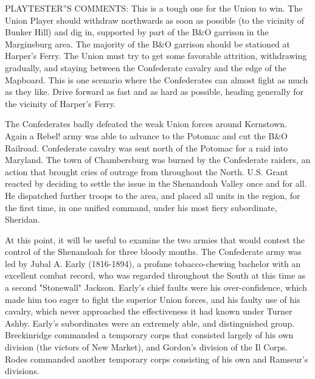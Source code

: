 PLAYTESTER''S COMMENTS: This is a tough one for the Union to win. The Union Player should withdraw northwards as soon as possible (to the vicinity of Bunker Hill) and dig in, supported by part of the B\&O garrison in the Marginsburg area. The majority of the B\&O garrison should be stationed at Harper's Ferry. The Union must try to get some favorable attrition, withdrawing gradually, and staying between the Confederate cavalry and the edge of the Mapboard. This is one scenario where the Confederates can almost fight as much as they like. Drive forward as fast and as hard as possible, heading generally for the vicinity of Harper's Ferry.

The Confederates badly defeated the weak Union forces around Kernstown. Again a Rebel! army was able to advance to the Potomac and cut the B\&O Railroad. Confederate cavalry was sent north of the Potomac for a raid into Maryland. The town of Chambersburg was burned by the Confederate raiders, an action that brought cries of outrage from throughout the North. U.S. Grant reacted by deciding to settle the issue in the Shenandoah Valley once and for all. He dispatched further troops to the area, and placed all units in the region, for the first time, in one unified command, under his most fiery subordinate, Sheridan.

At this point, it will be useful to examine the two armies that would contest the control of the Shenandoah for three bloody months. The Confederate army was led by Jubal A. Early (1816-1894), a profane tobacco-chewing bachelor with an excellent combat record, who was regarded throughout the South at this time as a second "Stonewall" Jackson. Early's chief faults were his over-confidence, which made him too eager to fight the superior Union forces, and his faulty use of his cavalry, which never approached the effectiveness it had known under Turner Ashby. Early's subordinates were an extremely able, and distinguished group. Breckinridge commanded a temporary corps that consisted largely of his own division (the victors of New Market), and Gordon's division of the Il Corps. Rodes commanded another temporary corps consisting of his own and Ramseur's divisions.

